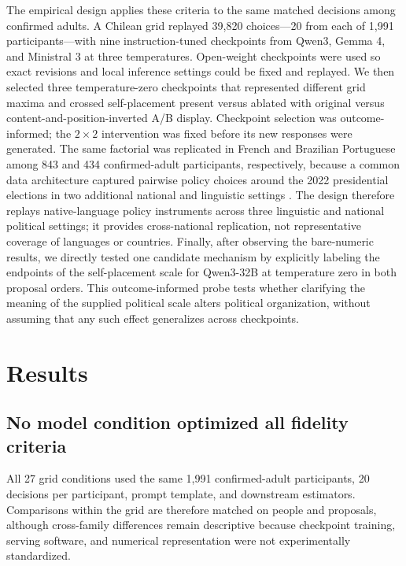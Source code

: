 \documentclass[unnumsec,webpdf,modern,large]{oup-authoring-template}
\begin{document}
The empirical design applies these criteria to the same matched decisions among confirmed adults. A Chilean grid replayed 39,820 choices---20 from each of 1,991 participants---with nine instruction-tuned checkpoints from Qwen3, Gemma 4, and Ministral 3 at three temperatures. Open-weight checkpoints were used so exact revisions and local inference settings could be fixed and replayed. We then selected three temperature-zero checkpoints that represented different grid maxima and crossed self-placement present versus ablated with original versus content-and-position-inverted A/B display. Checkpoint selection was outcome-informed; the $2\times2$ intervention was fixed before its new responses were generated. The same factorial was replicated in French and Brazilian Portuguese among 843 and 434 confirmed-adult participants, respectively, because a common data architecture captured pairwise policy choices around the 2022 presidential elections in two additional national and linguistic settings \citep{Navarrete2024}. The design therefore replays native-language policy instruments across three linguistic and national political settings; it provides cross-national replication, not representative coverage of languages or countries. Finally, after observing the bare-numeric results, we directly tested one candidate mechanism by explicitly labeling the endpoints of the self-placement scale for Qwen3-32B at temperature zero in both proposal orders. This outcome-informed probe tests whether clarifying the meaning of the supplied political scale alters political organization, without assuming that any such effect generalizes across checkpoints.

\section{Results}

\subsection{No model condition optimized all fidelity criteria}

All 27 grid conditions used the same 1,991 confirmed-adult participants, 20 decisions per participant, prompt template, and downstream estimators. Comparisons within the grid are therefore matched on people and proposals, although cross-family differences remain descriptive because checkpoint training, serving software, and numerical representation were not experimentally standardized.
\end{document}

